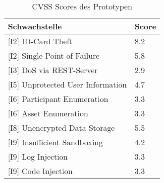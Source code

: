     	\begin{table}[H]
            \centering
            \sffamily
            \begin{tabular}{|l|l|}
            \hline
\textbf{Schwachstelle}                & \textbf{Score} \\ \hline
\rowcolor{light-gray}
{[}I2{]} ID-Card Theft                & \cellcolor{redorange}8.2            \\ \hline
{[}I2{]} Single Point of Failure      & \cellcolor{orange}5.8            \\ \hline
\rowcolor{light-gray}
{[}I3{]} DoS via REST-Server          & \cellcolor{yellow}2.9            \\ \hline
{[}I5{]} Unprotected User Information & \cellcolor{orange}4.7            \\ \hline
\rowcolor{light-gray}
{[}I6{]} Participant Enumeration      & \cellcolor{yellow}3.3            \\ \hline
{[}I6{]} Asset Enumeration            & \cellcolor{yellow}3.3            \\ \hline
\rowcolor{light-gray}
{[}I8{]} Unencrypted Data Storage     & \cellcolor{orange}5.5            \\ \hline
{[}I9{]} Insufficient Sandboxing      & \cellcolor{orange}4.2            \\ \hline
\rowcolor{light-gray}
{[}I9{]} Log Injection                & \cellcolor{yellow}3.3            \\ \hline
{[}I9{]} Code Injection               & \cellcolor{yellow}3.3            \\ \hline
            \end{tabular}
            \caption[CVSS Scores des Prototypen]{CVSS Scores des Prototypen}
            \label{tab:eval_cvss_short}
        \end{table}

